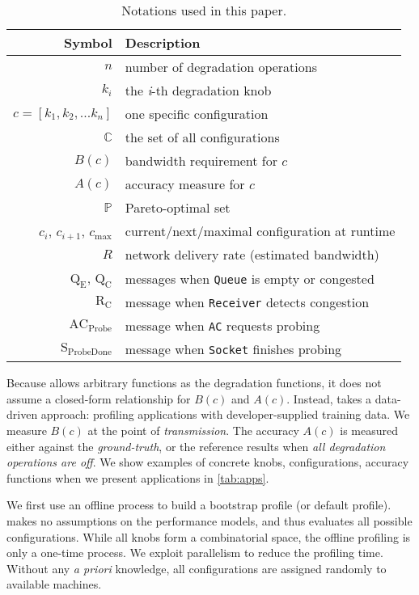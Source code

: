 \begin{table}
  \footnotesize
  \centering
  \begin{tabular}{r l}
    \toprule
    \textbf{Symbol} & \textbf{Description} \\
    \midrule
    $n$ & number of degradation operations \\
    $k_i$ & the \textit{i}-th degradation knob \\
    $c = [k_{1}, k_{2}, ... k_{n}]$ & one specific configuration \\
    $\mathbb{C}$ & the set of all configurations \\
    \midrule
    $B(c)$ & bandwidth requirement for $c$ \\
    $A(c)$ & accuracy measure for $c$ \\
    $\mathbb{P}$ & Pareto-optimal set \\
    \midrule
    $c_i$, $c_{i+1}$, $c_{\max}$ & current/next/maximal configuration at runtime \\
    $R$ & network delivery rate (estimated bandwidth) \\
    $\text{Q}_\text{E}$, $\text{Q}_\text{C}$ & messages when \texttt{Queue} is empty or congested \\
    $\text{R}_\text{C}$ & message when \texttt{Receiver} detects congestion \\
    $\text{AC}_\text{Probe}$ & message when \texttt{AC} requests probing \\
    $\text{S}_\text{ProbeDone}$ & message when \texttt{Socket} finishes probing \\
    \bottomrule
  \end{tabular}
  \caption{Notations used in this paper.}
  \label{tab:notations}
\end{table}

Because \sysname{} allows arbitrary functions as the degradation functions, it
does not assume a closed-form relationship for $B(c)$ and $A(c)$. Instead,
\sysname{} takes a data-driven approach: profiling applications with
developer-supplied training data.  We measure $B(c)$ at the point of
\textit{transmission}. The accuracy $A(c)$ is measured either against the
\textit{ground-truth}, or the reference results when \textit{all degradation
  operations are off}.  We show examples of concrete knobs, configurations,
accuracy functions when we present applications in \autoref{tab:apps}.

 We first use an offline process to build a bootstrap
profile (or default profile).  \sysname{} makes no assumptions on the
performance models, and thus evaluates all possible configurations.  While all
knobs form a combinatorial space, the offline profiling is only a one-time
process.  We exploit parallelism to reduce the profiling time.  Without any
\textit{a priori} knowledge, all configurations are assigned randomly to
available machines.

